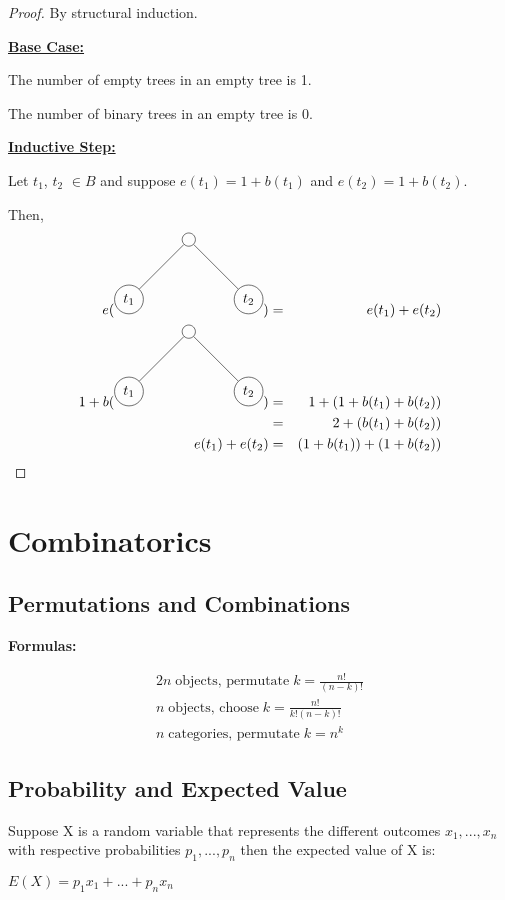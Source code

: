 \documentclass{article}
\begin{document}
\begin{proof}
By structural induction.

\underline{\textbf{Base Case:}}

The number of empty trees in an empty tree is 1. \checkmark

The number of binary trees in an empty tree is 0. \checkmark

\underline{\textbf{Inductive Step:}}

Let $ t_1 $, $ t_2 $ $ \in B $ and suppose $ e(t_1) = 1 + b(t_1) $ and $ e(t_2) = 1 + b(t_2) $.

Then, 
\begin{alignat*}{2}
e( 
\begin{tikzpicture}[
  every node/.style={circle, draw},
  level/.style={sibling distance=30mm/#1}
]
  \node {}
    child {node {$t_1$}
  }
    child {node {$t_2$}
  };
\end{tikzpicture}
) &=& e(t_1) + e(t_2)
\\
1 + b( \begin{tikzpicture}[
  every node/.style={circle, draw},
  level/.style={sibling distance=30mm/#1}
]
  \node {}
    child {node {$t_1$}
  }
    child {node {$t_2$}
  };
\end{tikzpicture}
)
&=& 1 + (1 + b(t_1) + b(t_2))
\\
&=& 2 + (b(t_1) + b(t_2))
\\
e(t_1) + e(t_2) &=& (1 + b(t_1)) + (1 + b(t_2)) 
\end{alignat*}
\end{proof}
\clearpage

\section{Combinatorics}
\subsection{Permutations and Combinations}
\textbf{Formulas:}

\begin{alignat*}{2}
  n\;\text{objects, permutate} \;k = \frac{n!}{(n-k)!} \\
  n\;\text{objects, choose}\; k = \frac{n!}{k!{(n-k)}!} \\
  n\;\text{categories, permutate} \;k = n^k 
\end{alignat*}

\subsection{Probability and Expected Value}
Suppose X is a random variable that represents the different outcomes $ x_1, ..., x_n $ with respective
probabilities $p_1, ..., p_n$ then the expected value of X is:

\begin{center}
  $E(X) = p_1x_1 + ... + p_nx_n $
\end{center}
\end{document}
